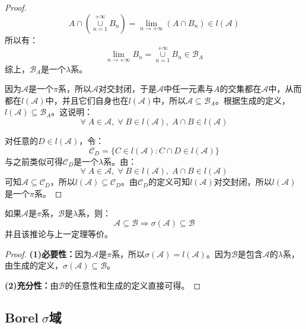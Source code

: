 \begin{proof}
\begin{equation*}
		A\cap\left(\underset{n=1}{\overset{+\infty}{\cup}}B_n\right)=\lim_{n\to+\infty}(A\cap B_n)\in l(\mathscr{A})
	\end{equation*}
	所以有：
	\begin{equation*}
		\lim_{n\to+\infty}B_n=\underset{n=1}{\overset{+\infty}{\cup}}B_n\in\mathscr{B}_A
	\end{equation*}
	综上，$\mathscr{B}_A$是一个$\lambda$系。\par
	因为$\mathscr{A}$是一个$\pi$系，所以$\mathscr{A}$对交封闭，于是$\mathscr{A}$中任一元素与$A$的交集都在$\mathscr{A}$中，从而都在$l(\mathscr{A})$中，并且它们自身也在$l(\mathscr{A})$中，所以$\mathscr{A}\subseteq \mathscr{B}_A$。根据生成的定义，$l(\mathscr{A})\subseteq \mathscr{B}_A$。这说明：
	\begin{equation*}
		\forall\;A\in \mathscr{A},\;\forall\;B\in l(\mathscr{A}),\;A\cap B\in l(\mathscr{A})
	\end{equation*}\par
	对任意的$D\in l(\mathscr{A})$，令：
	\begin{equation*}
		\mathscr{C}_D=\{C\in l(\mathscr{A}):C\cap D\in l(\mathscr{A})\}
	\end{equation*}
	与之前类似可得$\mathscr{C}_D$是一个$\lambda$系。由：
	\begin{equation*}
		\forall\;A\in \mathscr{A},\;\forall\;B\in l(\mathscr{A}),\;A\cap B\in l(\mathscr{A})
	\end{equation*}
	可知$\mathscr{A}\subseteq\mathscr{C}_D$，所以$l(\mathscr{A})\subseteq\mathscr{C}_D$。由$\mathscr{C}_D$的定义可知$l(\mathscr{A})$对交封闭，所以$l(\mathscr{A})$是一个$\pi$系。
\end{proof}
\begin{corollary}\label{cor:SigmaPi=LambdaPi}
	如果$\mathscr{A}$是$\pi$系，$\mathscr{B}$是$\lambda$系，则：
	\begin{equation*}
		\mathscr{A}\subseteq \mathscr{B}\Rightarrow\sigma(\mathscr{A})\subseteq\mathscr{B}
	\end{equation*}
	并且该推论与上一定理等价。
\end{corollary}
\begin{proof}
	\textbf{(1)必要性：}因为$\mathscr{A}$是$\pi$系，所以$\sigma(\mathscr{A})=l(\mathscr{A})$。因为$\mathscr{B}$是包含$\mathscr{A}$的$\lambda$系，由生成的定义，$\sigma(\mathscr{A})\subseteq\mathscr{B}$。\par
	\textbf{(2)充分性：}由$\mathscr{B}$的任意性和生成的定义直接可得。
\end{proof}

\subsection{Borel$\;\sigma$域}
